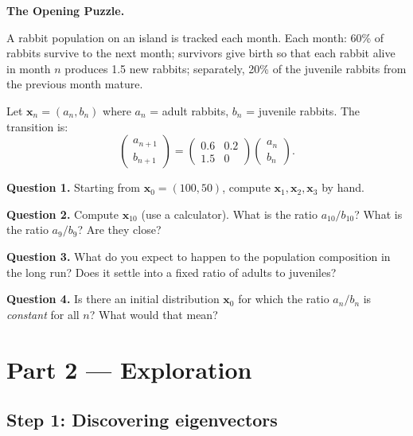 \documentclass[12pt, a4paper]{article}
\begin{document}
\begin{puzzlebox}
\textbf{The Opening Puzzle.}

A rabbit population on an island is tracked each month. Each month: 60\% of rabbits survive to the next month; survivors give birth so that each rabbit alive in month $n$ produces 1.5 new rabbits; separately, 20\% of the juvenile rabbits from the previous month mature.

Let $\mathbf{x}_n = (a_n, b_n)$ where $a_n$ = adult rabbits, $b_n$ = juvenile rabbits. The transition is:
\[
  \begin{pmatrix}a_{n+1}\\b_{n+1}\end{pmatrix}
  = \begin{pmatrix}0.6 & 0.2 \\ 1.5 & 0\end{pmatrix}
  \begin{pmatrix}a_n\\b_n\end{pmatrix}.
\]

\textbf{Question 1.} Starting from $\mathbf{x}_0 = (100, 50)$, compute $\mathbf{x}_1, \mathbf{x}_2, \mathbf{x}_3$ by hand.

\textbf{Question 2.} Compute $\mathbf{x}_{10}$ (use a calculator). What is the ratio $a_{10}/b_{10}$? What is the ratio $a_9/b_9$? Are they close?

\textbf{Question 3.} What do you expect to happen to the population composition in the long run? Does it settle into a fixed ratio of adults to juveniles?

\textbf{Question 4.} Is there an initial distribution $\mathbf{x}_0$ for which the ratio $a_n/b_n$ is \emph{constant} for all $n$? What would that mean?
\end{puzzlebox}

\section{Part 2 \texorpdfstring{---}{--} Exploration}

\subsection{Step 1: Discovering eigenvectors}
\end{document}
